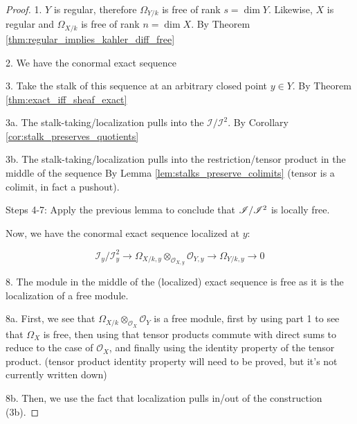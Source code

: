\begin{proof}

  1. $Y$ is regular, therefore 
     $\Omega_{Y/k}$ is free of rank
     $s = \dim Y$.
     Likewise, $X$ is regular and
     $\Omega_{X/k}$ is free of rank
     $n = \dim X$.
  By Theorem \ref{thm:regular_implies_kahler_diff_free}
  
  2. We have the conormal exact sequence

  3. Take the stalk of this sequence at an
     arbitrary closed point $y \in Y$.
     By Theorem \ref{thm:exact_iff_sheaf_exact}

  3a. The stalk-taking/localization
      pulls into the $\mathcal{I} / \mathcal{I}^2$.
      By Corollary \ref{cor:stalk_preserves_quotients}

  3b. The stalk-taking/localization
      pulls into the restriction/tensor product
      in the middle of the sequence
      By Lemma \ref{lem:stalks_preserve_colimits} 
      (tensor is a colimit, in fact a pushout).
  
  Steps 4-7: Apply the previous lemma to conclude that
  $\mathscr{I} / \mathscr{I}^{2}$ is locally free.

  Now, we have the conormal exact sequence localized at $y$:

  \[
    \mathcal{I}_y / \mathcal{I}^2_y 
    \to
    \Omega_{X/k,y} \otimes_{\mathcal{O}_{X,y}} \mathcal{O}_{Y,y} 
    \to
    \Omega_{Y/k,y} 
    \to 0
  \]

  8. The module in the middle of the (localized) exact sequence is free as it is 
     the localization of a free module. 

  8a. First, we see that $\Omega_{X/k} \otimes_{\mathcal{O}_X} \mathcal{O}_Y$ is a free module,
      first by using part 1 to see that $\Omega_X$ is free, then using that
      tensor products commute with direct sums to reduce to the case of $\mathcal{O}_X$,
      and finally using the identity property of the tensor product.
      (tensor product identity property will need to be proved, but it's not currently written down)

  8b. Then, we use the fact that localization pulls in/out of the construction (3b).


\end{proof}
